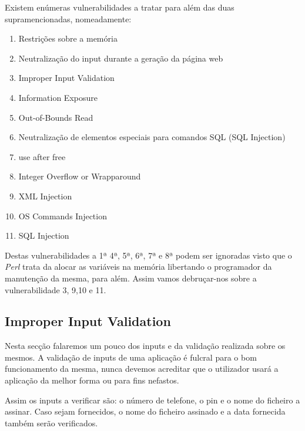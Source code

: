 Existem enúmeras vulnerabilidades a tratar para além das duas supramencionadas, nomeadamente:
\begin{enumerate}
\item Restrições sobre a memória
\item Neutralização do input durante a geração da página web
\item Improper Input Validation
\item Information Exposure
\item Out-of-Bounds Read
\item Neutralização de elementos especiais para comandos SQL (SQL Injection)
\item use after free
\item Integer Overflow or Wrapparound
\item XML Injection
\item OS Commands Injection
\item SQL Injection
\end{enumerate}

Destas vulnerabilidades a 1ª 4ª, 5ª, 6ª, 7ª e 8ª podem ser ignoradas visto que o \textit{Perl} trata da alocar as variáveis na memória libertando o programador da manutenção da mesma, para além. Assim vamos debruçar-nos sobre a vulnerabilidade 3, 9,10 e 11.


\subsection{Improper Input Validation}

Nesta secção falaremos um pouco dos inputs e da validação realizada sobre os mesmos. A validação de inputs de uma aplicação é fulcral para o bom funcionamento da mesma, nunca devemos acreditar que o utilizador usará a aplicação da melhor forma ou para fins nefastos.\newline


Assim os inputs a verificar são:  o número de telefone, o pin e o nome do ficheiro a assinar. Caso sejam fornecidos, o nome do ficheiro assinado e a data fornecida também serão verificados.\newline

